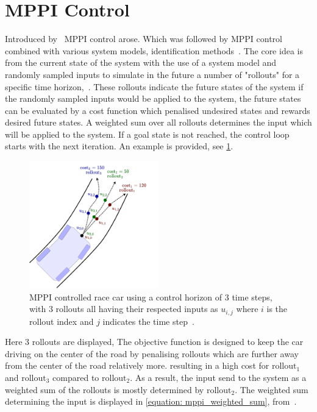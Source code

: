\section{\ac{MPPI} Control}
\label{sec:appendix_mppi}
Introduced by~\cite{williams_model_2015} \ac{MPPI} control arose. Which was followed by \ac{MPPI} control combined with various system models, identification methods~\cite{abraham_modelbased_2020,cong_selfadapting_2020,arruda_uncertainty_2017}. The core idea is from the current state of the system with the use of a system model and randomly sampled inputs to simulate in the future a number of "rollouts" for a specific time horizon,~\cite{neuromorphictutorial_ltc21_2021}. These rollouts indicate the future states of the system if the randomly sampled inputs would be applied to the system, the future states can be evaluated by a cost function which penalised undesired states and rewards desired future states. A weighted sum over all rollouts determines the input which will be applied to the system. If a goal state is not reached, the control loop starts with the next iteration. An example is provided, see  \cref{figure: mppi_car_with_rollouts}. 

\begin{figure}[H]
    \centering
    \includegraphics[width=0.5\textwidth]{figures/appendix/MPPI_car_with_rollouts.png}
    \caption{\acs{MPPI} controlled race car using a control horizon of 3 time steps, with 3 rollouts all having their respected inputs as $u_{i,j}$ where $i$ is the rollout index and $j$ indicates the time step~\cite{neuromorphictutorial_ltc21_2021}.}
    \label{figure: mppi_car_with_rollouts}
\end{figure}

Here 3 rollouts are displayed, The objective function is designed to keep the car driving on the center of the road by penalising rollouts which are further away from the center of the road relatively more. resulting in a high cost for $\text{rollout}_1$ and $\text{rollout}_3$ compared to $\text{rollout}_2$. As a result, the input send to the system as a weighted sum of the rollouts is mostly determined by $\text{rollout}_2$. The weighted sum determining the input is displayed in \cref{equation: mppi_weighted_sum}, from~\cite{neuromorphictutorial_ltc21_2021}.

